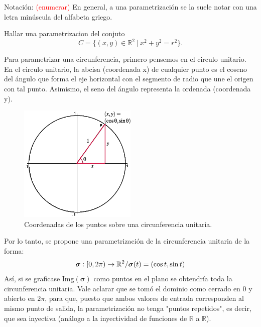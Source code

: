    
   Notaci\'on:  \textcolor{red}{(enumerar)}  En general,  a una  parametrización se la suele notar con una letra min\'uscula del alfabeta griego.

    \begin{example} Hallar una parametrizacion del conjuto 
      \begin{equation*}
    C = \{  (x,y)  \in \mathbb{R}^2 \:|\:   x^2+y^2=r^2 \}.
    \end{equation*}  
        
        Para parametrizar una circunferencia, primero pensemos en el circulo unitario.
        En el circulo unitario, la abcisa (coordenada x) de cualquier punto es el coseno del ángulo que forma el eje horizontal con el segmento de radio
        que une el origen con tal punto. Asimismo, el seno del ángulo representa la ordenada (coordenada y).
        \begin{figure}[H] 
            \centering
            \includegraphics[width=0.5\textwidth]{../figs/unitCircle1.png} %
            \caption{Coordenadas de los puntos sobre una circunferencia unitaria.}
            \label{fig:unitCircle1} %
        \end{figure}
        Por lo tanto, se propone una parametrización de la circunferencia unitaria de la forma:
        \begin{equation*}
            \boldsymbol{\sigma}:[0,2\pi)\rightarrow\mathbb{R}^2/ \\ \boldsymbol{\sigma}(t)=(\cos{t},\sin{t})
        \end{equation*}
        Así, si se graficase $\text{Img}(\boldsymbol{\sigma})$ como puntos en el plano se obtendría toda la circunferencia unitaria.
        Vale aclarar que se tomó el dominio como cerrado en $0$ y abierto en $2\pi$, para que, puesto que ambos valores de 
        entrada corresponden al mismo punto de salida, la parametrización no tenga "puntos repetidos", es decir, que sea inyectiva 
        (análogo a la inyectividad de funciones de $\mathbb{R}$ a $\mathbb{R}$).
        
         \end{example}
